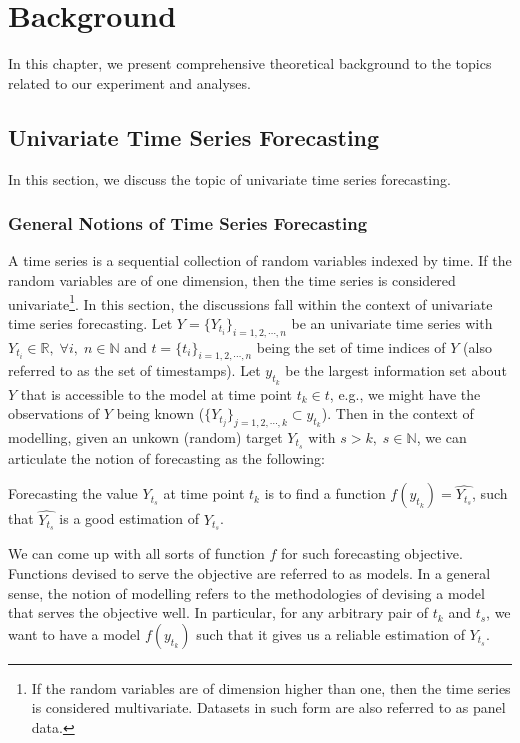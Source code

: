 \chapter{Background}\label{ch: background}

In this chapter, we present comprehensive theoretical background to the topics related to our experiment and analyses.

\section{Univariate Time Series Forecasting}
In this section, we discuss the topic of univariate time series forecasting.

\subsection{General Notions of Time Series Forecasting}
A time series is a sequential collection of random variables indexed by time. If the random variables are of one dimension, then the time series is considered univariate\footnote{If the random variables are of dimension higher than one, then the time series is considered multivariate. Datasets in such form are also referred to as panel data.}. In this section, the discussions fall within the context of univariate time series forecasting. Let $Y = \{Y_{t_i} \}_{i = 1, 2, \cdots, n}$ be an univariate time series with $ Y_{t_i} \in \mathbb{R}, \; \forall i, \; n \in \mathbb{N}$ and $t = \{t_i \}_{i = 1, 2, \cdots, n}$ being the set of time indices of $Y$ (also referred to as the set of timestamps). Let $y_{t_k}$ be the largest information set about $Y$ that is accessible to the model at time point $t_k \in t$, e.g., we might have the observations of $Y$ being known ($\{Y_{t_j}\}_{j = 1, 2, \cdots, k } \subset y_{t_k}$). Then in the context of modelling, given an unkown (random) target $Y_{t_s}$ with $s > k, \; s \in \mathbb{N}$, we can articulate the notion of forecasting as the following:
\begin{displayquote}
    Forecasting the value $Y_{t_s}$ at time point $t_k$ is to find a function $f(y_{t_k}) = \widehat{Y_{t_s}}$, such that $\widehat{Y_{t_s}}$ is a good estimation of $Y_{t_s}$.
\end{displayquote}
We can come up with all sorts of function $f$ for such forecasting objective. Functions devised to serve the objective are referred to as models. In a general sense, the notion of modelling refers to the methodologies of devising a model that serves the objective well. In particular, for any arbitrary pair of $t_k$ and $t_s$, we want to have a model $f(y_{t_k})$ such that it gives us a reliable estimation of $Y_{t_s}$.

